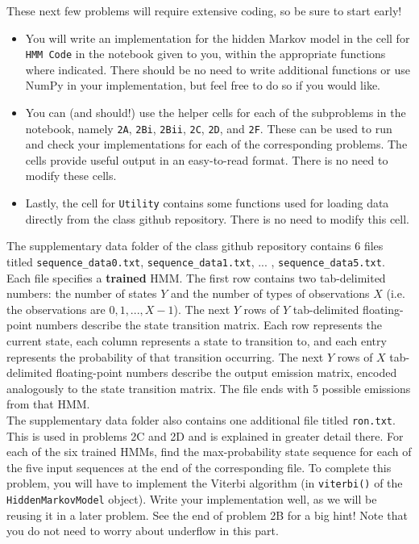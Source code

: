 These next few problems will require extensive coding, so be sure to start early! 
\begin{itemize}
  \item You will write an implementation for the hidden Markov model in the cell for \texttt{HMM Code} in the notebook given to you, within the appropriate functions where indicated. There should be no need to write additional functions or use NumPy in your implementation, but feel free to do so if you would like.
  \item You can (and should!) use the helper cells for each of the subproblems in the notebook, namely \texttt{2A}, \texttt{2Bi}, \texttt{2Bii}, \texttt{2C}, \texttt{2D}, and \texttt{2F}. These can be used to run and check your implementations for each of the corresponding problems. The cells provide useful output in an easy-to-read format. There is no need to modify these cells.
  \item Lastly, the cell for \texttt{Utility} contains some functions used for loading data directly from the class github repository. There is no need to modify this cell. \\
\end{itemize}

The supplementary data folder of the class github repository contains 6 files titled \texttt{sequence_data0.txt}, \texttt{sequence_data1.txt}, ... , \texttt{sequence_data5.txt}. Each file specifies a \textbf{trained} HMM. The first row contains two tab-delimited numbers: the number of states $Y$ and the number of types of observations $X$ (i.e. the observations are $0, 1, . . . , X - 1$). The next $Y$ rows of $Y$ tab-delimited floating-point numbers describe the state transition matrix. Each row represents the current state, each column represents a state to transition to, and each entry represents the probability of that transition occurring. The next $Y$ rows of $X$ tab-delimited floating-point numbers describe the output emission matrix, encoded analogously to the state transition matrix. The file ends with 5 possible emissions from that HMM. \\

The supplementary data folder also contains one additional file titled \texttt{ron.txt}. This is used in problems 2C and 2D and is explained in greater detail there. 
\indent\problem[10] %
For each of the six trained HMMs, find the max-probability state sequence for each of the five input sequences at the end of the corresponding file. To complete this problem, you will have to implement the Viterbi algorithm (in \texttt{viterbi()} of the \texttt{HiddenMarkovModel} object). Write your implementation well, as we will be reusing it in a later problem. See the end of problem 2B for a big hint! Note that you do not need to worry about underflow in this part.

